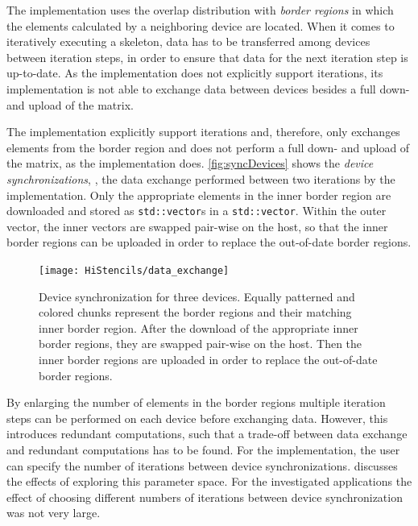The  implementation uses the overlap distribution with \textit{border regions} in which the elements calculated by a neighboring device are located.
When it comes to iteratively executing a skeleton, data has to be transferred among devices between iteration steps, in order to ensure that data for the next iteration step is up-to-date.
As the  implementation does not explicitly support iterations, its implementation is not able to exchange data between devices besides a full down- and upload of the matrix.

The  implementation explicitly support iterations and, therefore, only exchanges elements from the border region and does not perform a full down- and upload of the matrix, as the  implementation does.
\autoref{fig:syncDevices} shows the \textit{device synchronizations}, \ie, the data exchange performed between two iterations by the  implementation.
Only the appropriate elements in the inner border region are downloaded and stored as \texttt{std::vector}s in a \texttt{std::vector}.
Within the outer vector, the inner vectors are swapped pair-wise on the host, so that the inner border regions can be uploaded in order to replace the out-of-date border regions.

\begin{figure}[tb]
  \centering
  \texttt{[image: HiStencils/data\_exchange]}
  \caption{\small Device synchronization for three devices. Equally patterned and colored chunks represent the border regions and their matching inner border region. After the download of the appropriate inner border regions, they are swapped pair-wise on the host. Then the inner border regions are uploaded in order to replace the out-of-date border regions.}
  \label{fig:syncDevices}
  \vspace{1em}
\end{figure}


By enlarging the number of elements in the border regions multiple iteration steps can be performed on each device before exchanging data.
However, this introduces redundant computations, such that a trade-off between data exchange and redundant computations has to be found.
For the  implementation, the user can specify the number of iterations between device synchronizations.
\cite{Breuer2014} discusses the effects of exploring this parameter space.
For the investigated applications the effect of choosing different numbers of iterations between device synchronization was not very large.



